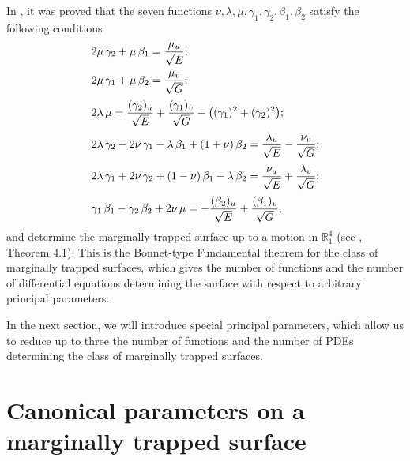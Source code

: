 \documentclass[12pt]{amsart}
\newcommand{\R}{\mathbb R}
\theoremstyle{definition}
\theoremstyle{remark}
\numberwithin{equation}{section}
\begin{document}
 In  \cite{G-M-JMP-2012}, it was proved that the seven functions $\nu, \lambda, \mu, \gamma_1, \gamma_2, \beta_1, \beta_2$  satisfy the following conditions
 \begin{equation} \label{eq:BasicSystem}
 	\begin{array}{l}
 		\vspace{2mm} 2\mu\, \gamma_2 + \mu\,\beta_1 =
 		\displaystyle{\frac{\mu_u}{\sqrt{E}}  };\\
 		\vspace{2mm} 2\mu\, \gamma_1+ \mu\,\beta_2 =
 		\displaystyle{\frac{\mu_v}{\sqrt{G}} };\\
 		\vspace{2mm}
 		2\lambda\, \mu =
 		\displaystyle{\frac{(\gamma_2)_u}{\sqrt{E}}
 			+ \frac{(\gamma_1)_v}{\sqrt{G}} - \left((\gamma_1)^2 + (\gamma_2)^2\right)};\\
 		\vspace{2mm} 2\lambda\, \gamma_2 - 2\nu\, \gamma_1 - \lambda\,\beta_1 + (1+ \nu)\,\beta_2 =
 		\displaystyle{\frac{\lambda_u}{\sqrt{E}}  - \frac{\nu_v}{\sqrt{G}}};\\
 		\vspace{2mm} 2\lambda\, \gamma_1 + 2\nu\, \gamma_2 + (1 - \nu)\,\beta_1 - \lambda\,\beta_2 =
 		\displaystyle{\frac{\nu_u}{\sqrt{E}} + \frac{\lambda_v}{\sqrt{G}}};\\
 		\gamma_1\,\beta_1 - \gamma_2\,\beta_2 + 2 \nu\,\mu  =
 		\displaystyle{ - \frac{(\beta_2)_u}{\sqrt{E}} +
 			\frac{(\beta_1)_v}{\sqrt{G}}},
 	\end{array}
 \end{equation}
and determine the marginally trapped surface  up to a motion in $\R^4_1$ (see \cite{G-M-JMP-2012}, Theorem 4.1). This is the Bonnet-type Fundamental theorem for the class of marginally trapped surfaces, which gives the number of functions and the number of differential equations determining the surface   with respect to arbitrary principal parameters.

In the next section, we will introduce special principal parameters, which  allow us to reduce up to three the number of functions  and the  number of PDEs determining the class of marginally trapped surfaces.



\section{Canonical parameters on a marginally trapped surface}
\end{document}
